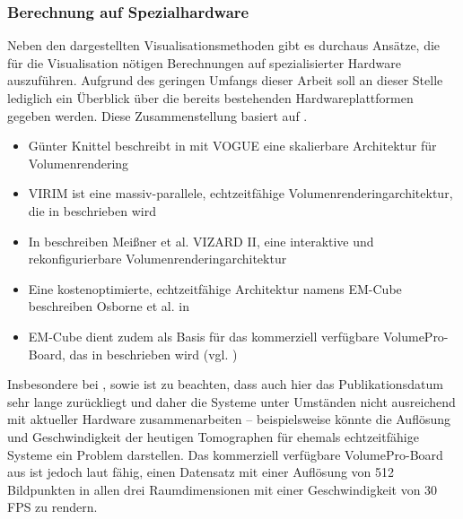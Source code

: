 \documentclass[ngerman,pdftex,paper=A4,DIV=calc,titlepage,12pt]{scrartcl}
\newtheorem[L]{boxedDefinition}{Definition}
\begin{document}
\subsubsection{Berechnung auf Spezialhardware}\label{sssec:specialhardwarecalculation}
Neben den dargestellten Visualisationsmethoden gibt es durchaus Ansätze, die für die Visualisation nötigen Berechnungen auf spezialisierter Hardware auszuführen. Aufgrund des geringen Umfangs dieser Arbeit soll an dieser Stelle lediglich ein Überblick über die bereits bestehenden Hardwareplattformen gegeben werden. Diese Zusammenstellung basiert auf \cite[Kapitel 2.5.5, Seite 14]{Bruckner2004}.
\begin{itemize}
 \item Günter Knittel beschreibt in \cite{Knittel1995} mit VOGUE eine skalierbare Architektur für Volumenrendering
 \item VIRIM ist eine massiv-parallele, echtzeitfähige Volumenrenderingarchitektur, die in \cite{Guenther1995} beschrieben wird
 \item In \cite{Meissner2002} beschreiben Meißner et al. VIZARD II, eine interaktive und rekonfigurierbare Volumenrenderingarchitektur
 \item Eine kostenoptimierte, echtzeitfähige Architektur namens EM-Cube beschreiben Osborne et al. in \cite{Osborne1997}
 \item EM-Cube dient zudem als Basis für das kommerziell verfügbare VolumePro-Board, das in \cite{Pfister1999} beschrieben wird (vgl. \cite[Kapitel 2.2.5, Seite 14]{Bruckner2004})
\end{itemize}
Insbesondere bei \cite{Knittel1995}, \cite{Guenther1995} sowie \cite{Osborne1997} ist zu beachten, dass auch hier das Publikationsdatum sehr lange zurückliegt und daher die Systeme unter Umständen nicht ausreichend mit aktueller Hardware zusammenarbeiten -- beispielsweise könnte die Auflösung und Geschwindigkeit der heutigen Tomographen für ehemals echtzeitfähige Systeme ein Problem darstellen. Das kommerziell verfügbare VolumePro-Board aus \cite{Pfister1999} ist jedoch laut \cite[Kapitel 2.2.5, Seite 14]{Bruckner2004} fähig, einen Datensatz mit einer Auflösung von 512 Bildpunkten in allen drei Raumdimensionen mit einer Geschwindigkeit von 30 FPS zu rendern.
\end{document}
